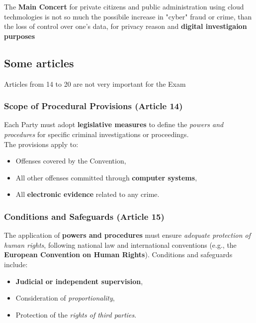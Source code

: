 \begin{boxH}
  The \textbf{Main Concert} for private citizens and public administration using cloud techmologies is not so much the possibile increase in "cyber" fraud or crime, than the loss of control over one's data, for privacy reason and \textbf{digital investigaion purposes}
\end{boxH}

\subsection{Some articles}

\begin{boxH}
  Articles from 14 to 20 are not very important for the Exam
\end{boxH}

\subsubsection{Scope of Procedural Provisions (Article 14)}

Each Party must adopt \textbf{legislative measures} to define the \textit{powers and procedures} for specific criminal investigations or proceedings.\\ The provisions apply to:

\begin{itemize}[itemsep=0pt]
    \item Offenses covered by the Convention,
    \item All other offenses committed through \textbf{computer systems},
    \item All \textbf{electronic evidence} related to any crime.
\end{itemize}

\subsubsection{Conditions and Safeguards (Article 15)}

The application of \textbf{powers and procedures} must ensure \textit{adequate protection of human rights}, following national law and international conventions (e.g., the \textbf{European Convention on Human Rights}). Conditions and safeguards include:

\begin{itemize}[itemsep=0pt]
    \item \textbf{Judicial or independent supervision},
    \item Consideration of \textit{proportionality},
    \item Protection of the \textit{rights of third parties}.
\end{itemize}

